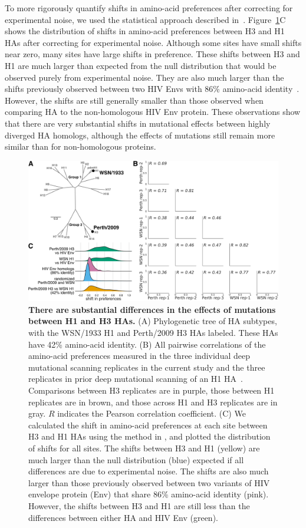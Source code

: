 \documentclass[9pt,twocolumn,twoside]{pnas-new}
\begin{document}
To more rigorously quantify shifts in amino-acid preferences after correcting for experimental noise, we used the statistical approach described in~\cite{doud2015site,haddox2017mapping}.
Figure~\ref{fig:distance_distribution}C shows the distribution of shifts in amino-acid preferences between H3 and H1 HAs after correcting for experimental noise.
Although some sites have small shifts near zero, many sites have large shifts in preference.
These shifts between H3 and H1 are much larger than expected from the null distribution that would be observed purely from experimental noise.
They are also much larger than the shifts previously observed between two HIV Envs with 86\% amino-acid identity~\cite{haddox2017mapping}.
However, the shifts are still generally smaller than those observed when comparing HA to the non-homologous HIV Env protein. 
These observations show that there are very substantial shifts in mutational effects between highly diverged HA homologs, although the effects of mutations still remain more similar than for non-homologous proteins.

\begin{figure}
\centering
\includegraphics[width=12cm]{figs/distance_distribution/distance_distribution.pdf}
\caption{\label{fig:distance_distribution}
{\bf There are substantial differences in the effects of mutations between H1 and H3 HAs.}
(A) Phylogenetic tree of HA subtypes, with the WSN/1933 H1 and Perth/2009 H3 HAs labeled. 
These HAs have 42\% amino-acid identity.
(B) All pairwise correlations of the amino-acid preferences measured in the three individual deep mutational scanning replicates in the current study  and the three replicates in prior deep mutational scanning of an H1 HA~\cite{doud2016accurate}.
Comparisons between H3 replicates are in purple, those between H1 replicates are in brown, and those across H1 and H3 replicates are in gray. 
$R$ indicates the Pearson correlation coefficient.
(C) We calculated the shift in amino-acid preferences at each site between H3 and H1 HAs using the method in \cite{haddox2017mapping}, and plotted the distribution of shifts for all sites.
The shifts between H3 and H1 (yellow) are much larger than the null distribution (blue) expected if all differences are due to experimental noise.
The shifts are also much larger than those previously observed between two variants of HIV envelope protein (Env) that share 86\% amino-acid identity (pink).
However, the shifts between H3 and H1 are still less than the differences between either HA and HIV Env (green).
}
\end{figure}
\end{document}
